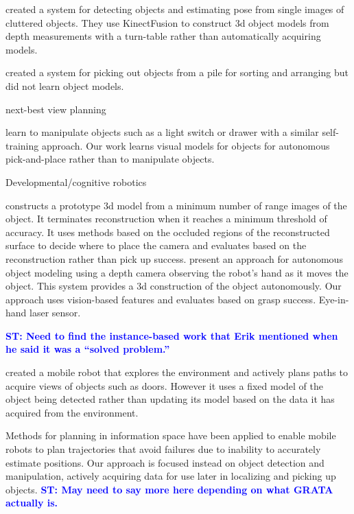 \documentclass[graybox]{svmult}
\newcommand{\stnote}[1]{\textcolor{blue}{\textbf{ST: #1}}}
\begin{document}
\citet{zhu14} created a system for detecting objects and estimating
pose from single images of cluttered objects.  They use KinectFusion
to construct 3d object models from depth measurements with a
turn-table rather than automatically acquiring models.

\citet{chang12} created a system for picking out objects from a pile
for sorting and arranging but did not learn object models.  

next-best view planning~\citep{kriegel11}

\citet{nguyen14} learn to manipulate objects such as a light switch or
drawer with a similar self-training approach.  Our work learns visual
models for objects for autonomous pick-and-place rather than to
manipulate objects.

Developmental/cognitive robotics~\citep{lyubova13, kraft10r}

\citet{banta00} constructs a prototype 3d model from a minimum number
of range images of the object.  It terminates reconstruction when it
reaches a minimum threshold of accuracy.  It uses methods based on the
occluded regions of the reconstructed surface to decide where to place
the camera and evaluates based on the reconstruction rather than pick
up success.  \citet{krainin11} present an approach for autonomous
object modeling using a depth camera observing the robot's hand as it
moves the object.  This system provides a 3d construction of the
object autonomously.  Our approach uses vision-based features and
evaluates based on grasp success.  Eye-in-hand laser
sensor.~\citep{aeotti14}

\stnote{Need to find the instance-based work that Erik mentioned when
  he said it was a ``solved problem.''}

\citet{velez11} created a mobile robot that explores the environment
and actively plans paths to acquire views of objects such as doors.
However it uses a fixed model of the object being detected rather than
updating its model based on the data it has acquired from the
environment.

Methods for planning in information space \citep{he08, atanasov13,
  prentice09} have been applied to enable mobile robots to plan
trajectories that avoid failures due to inability to accurately
estimate positions.  Our approach is focused instead on
object detection and manipulation, actively acquiring data for use
later in localizing and picking up objects. \stnote{May need to say
  more here depending on what GRATA actually is.}
\end{document}
